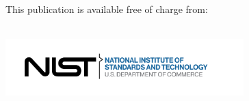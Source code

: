    \begin{titlepage}
    	\begin{flushright}
            \LARGE{}\\
            \LARGE{\sffamily{\textbf{\pubnumber}}}\\
            \vfill
            \Huge{\sffamily{\textbf{\pubtitle}}}\\
            \vfill
            \large \authorone\\
            \large \authortwo\\

            \vfill
            \normalsize This publication is available free of charge from:\\
            \DOI\\
            \vfill
            
            \includegraphics[trim=0 0 0.7in 0,clip,width=3.62in]{Figures/Logos/NIST-logo.png}\\ 
        \end{flushright}
        

\end{titlepage}
